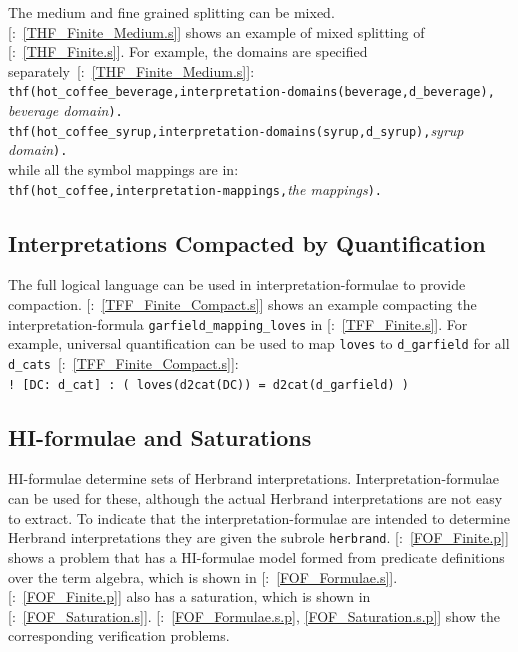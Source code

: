 \documentclass{ceurart}
\newcommand{\smalltt}[1]{\small \texttt{#1}}
\newcommand{\example}{{\scriptsize \faFile[regular]}}
\begin{document}
The medium and fine grained splitting can be mixed.
[\example{}:~\ref{THF_Finite_Medium.s}] shows an example of mixed 
splitting of [\example{}:~\ref{THF_Finite.s}].
For example, the domains are specified separately~[\example{}:~\ref{THF_Finite_Medium.s}]: \\
\hspace*{0.5cm}\smalltt{thf(hot\_coffee\_beverage,interpretation-domains(beverage,d\_beverage),}\\
\hspace*{0.9cm}\emph{beverage domain}\smalltt{).} \\
\hspace*{0.5cm}\smalltt{thf(hot\_coffee\_syrup,interpretation-domains(syrup,d\_syrup),}\emph{syrup domain}\smalltt{).} \\
while all the symbol mappings are in: \\
\hspace*{0.5cm}\smalltt{thf(hot\_coffee,interpretation-mappings,}\emph{the mappings}\smalltt{).}

\subsection{Interpretations Compacted by Quantification}
\label{NewTarskianCompact}

The full logical language can be used in interpretation-formulae to provide compaction.
[\example{}:~\ref{TFF_Finite_Compact.s}] shows an example compacting 
the interpretation-formula \smalltt{garfield\_mapping\_loves} in
[\example{}:~\ref{TFF_Finite.s}].
For example, universal quantification can be used to map \smalltt{loves} to \smalltt{d\_garfield} 
for all \smalltt{d\_cats}~[\example{}:~\ref{TFF_Finite_Compact.s}]: \\
\hspace*{0.5cm}\smalltt{!\,[DC:\,d\_cat]\,:\,(\,loves(d2cat(DC))\,=\,d2cat(d\_garfield)\,)}

\subsection{HI-formulae and Saturations}
\label{NewHerbrand}

HI-formulae determine sets of Herbrand interpretations.
Interpretation-formulae can be used for these, although the actual Herbrand interpretations are
not easy to extract.
To indicate that the interpretation-formulae are intended to determine Herbrand interpretations 
they are given the subrole \smalltt{herbrand}.
[\example{}:~\ref{FOF_Finite.p}] shows a problem that has a HI-formulae
model formed from predicate definitions over the term algebra, which is shown in 
[\example{}:~\ref{FOF_Formulae.s}].
[\example{}:~\ref{FOF_Finite.p}] also has a saturation, which is shown 
in [\example{}:~\ref{FOF_Saturation.s}].
[\example{}:~\ref{FOF_Formulae.s.p}, \ref{FOF_Saturation.s.p}] show 
the corresponding verification problems.
\end{document}
